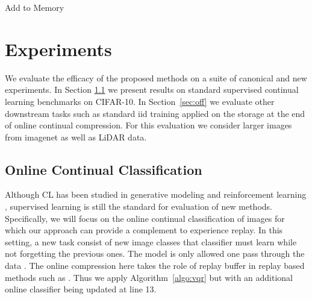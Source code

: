 \documentclass[colorinlistoftodos]{article} %
\begin{document}
\begin{minipage}{\textwidth}
\begin{minipage}{0.5\textwidth}
\begin{algorithm2e}[H]
{    }
    

 
 \caption{Add to Memory}
\label{algo:vqr}
\end{algorithm2e}
\end{minipage}
\end{minipage}
\section{Experiments}

We evaluate the efficacy of the proposed methods on a suite of canonical and new experiments. In  Section \ref{sec:can_cl} we present results on standard supervised continual learning benchmarks on CIFAR-10. In Section~\ref{sec:off} we evaluate other downstream tasks such as standard iid training applied on the storage at the end of online continual compression. For this evaluation we consider larger images from imagenet as well as LiDAR data.  

\subsection{Online Continual Classification}
\label{sec:can_cl}
Although CL has been studied in generative modeling \citep{lesort2018generative,ramapuram2017lifelong,Zhai2019LifelongGC} and reinforcement learning \citep{kirkpatrick2017overcoming,fernando2017pathnet,riemer2018learning}, supervised learning is still the standard for evaluation of new methods. Specifically, we will focus on the online continual classification of images for which our approach can provide a complement to experience replay. In this setting, a new task consist of new image classes that classifier must learn while not forgetting the previous ones. The model is only allowed one pass through the data \cite{lopez2017gradient,chaudhry2018efficient,aljundi2019online,chaudhry2019continual}. The online compression here takes the role of replay buffer in replay based methods such as \cite{chaudhry2019continual,aljundi2019online}. Thus we apply Algorithm~\ref{algo:vqr} but with an additional online classifier being updated at line 13.
\end{document}
